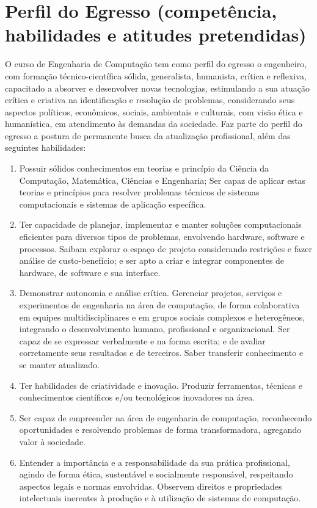 \section{Perfil do Egresso (competência, habilidades e atitudes pretendidas)}
O curso de Engenharia de Computação tem como perfil do egresso o engenheiro, com formação técnico-científica sólida, generalista, humanista, crítica e reflexiva, capacitado a absorver e desenvolver novas tecnologias, estimulando a sua atuação crítica e criativa na identificação e resolução de problemas, considerando seus aspectos políticos, econômicos, sociais, ambientais e culturais, com visão ética e humanística, em atendimento às demandas da sociedade. Faz parte do perfil do egresso a postura de permanente busca da atualização profissional, além das seguintes habilidades:
\begin{enumerate} [I -]
	\item Possuir sólidos conhecimentos em teorias e princípio da Ciência da Computação, Matemática, Ciências e Engenharia; Ser capaz de aplicar estas teorias e princípios para resolver problemas técnicos de sistemas computacionais e sistemas de aplicação específica.
	\item Ter capacidade de planejar, implementar e manter soluções computacionais eficientes para diversos tipos de problemas, envolvendo hardware, software e processos. Saibam explorar o espaço de projeto considerando restrições e fazer análise de custo-benefício; e ser apto a criar e integrar componentes de hardware, de software e sua interface.
	\item Demonstrar autonomia e análise crítica. Gerenciar projetos, serviços e experimentos de engenharia na área de computação, de forma colaborativa em equipes multidisciplinares e em grupos sociais complexos e heterogêneos, integrando o desenvolvimento humano, profissional e organizacional. Ser capaz de se expressar verbalmente e na forma escrita; e de avaliar corretamente seus resultados e de terceiros. Saber transferir conhecimento e se manter atualizado.
	\item Ter habilidades de criatividade e inovação. Produzir ferramentas, técnicas e conhecimentos científicos e/ou tecnológicos inovadores na área.
	\item Ser capaz de empreender na área de engenharia de computação, reconhecendo oportunidades e resolvendo problemas de forma transformadora, agregando valor à sociedade.
	\item Entender a importância e a responsabilidade da sua prática profissional, agindo de forma ética, sustentável e socialmente responsável, respeitando aspectos legais e normas envolvidas. Observem direitos e propriedades intelectuais inerentes à produção e à utilização de sistemas de computação.
\end{enumerate}

